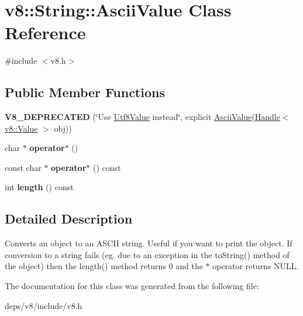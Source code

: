 \hypertarget{classv8_1_1_string_1_1_ascii_value}{}\section{v8\+:\+:String\+:\+:Ascii\+Value Class Reference}
\label{classv8_1_1_string_1_1_ascii_value}


{\ttfamily \#include $<$v8.\+h$>$}

\subsection*{Public Member Functions}
\begin{DoxyCompactItemize}
\item 
\hypertarget{classv8_1_1_string_1_1_ascii_value_a4e1559044a1e847517a9dcf6fca650d1}{}{\bfseries V8\+\_\+\+D\+E\+P\+R\+E\+C\+A\+T\+E\+D} (\char`\"{}Use \hyperlink{classv8_1_1_string_1_1_utf8_value}{Utf8\+Value} instead\char`\"{}, explicit \hyperlink{classv8_1_1_string_1_1_ascii_value}{Ascii\+Value}(\hyperlink{classv8_1_1_handle}{Handle}$<$ \hyperlink{classv8_1_1_value}{v8\+::\+Value} $>$ obj))\label{classv8_1_1_string_1_1_ascii_value_a4e1559044a1e847517a9dcf6fca650d1}

\item 
\hypertarget{classv8_1_1_string_1_1_ascii_value_a1e08f3a11aefee28cbbcbc386afd6032}{}char $\ast$ {\bfseries operator$\ast$} ()\label{classv8_1_1_string_1_1_ascii_value_a1e08f3a11aefee28cbbcbc386afd6032}

\item 
\hypertarget{classv8_1_1_string_1_1_ascii_value_abb007f038d674706da738f1f1f01f084}{}const char $\ast$ {\bfseries operator$\ast$} () const \label{classv8_1_1_string_1_1_ascii_value_abb007f038d674706da738f1f1f01f084}

\item 
\hypertarget{classv8_1_1_string_1_1_ascii_value_a97cccf0ed40a3deda1612c235b2f8068}{}int {\bfseries length} () const \label{classv8_1_1_string_1_1_ascii_value_a97cccf0ed40a3deda1612c235b2f8068}

\end{DoxyCompactItemize}


\subsection{Detailed Description}
Converts an object to an A\+S\+C\+I\+I string. Useful if you want to print the object. If conversion to a string fails (eg. due to an exception in the to\+String() method of the object) then the length() method returns 0 and the $\ast$ operator returns N\+U\+L\+L. 

The documentation for this class was generated from the following file\+:\begin{DoxyCompactItemize}
\item 
deps/v8/include/v8.\+h\end{DoxyCompactItemize}
